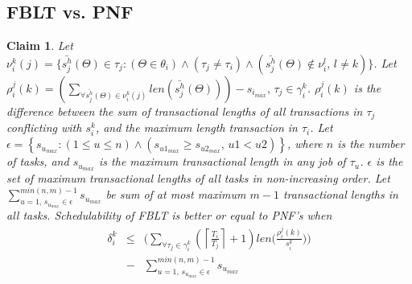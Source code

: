 \documentclass[conference]{IEEEtran}
\newtheorem{clm}{Claim}
\begin{document}
\subsection{FBLT vs. PNF}
%
\begin{clm}\label{clm:fblt_pnf_edf}
%
Let $\nu_{i}^{k}(j)=\Big\{ \bar{s_{j}^{h}}(\Theta)\in\tau_{j}:\left(\Theta\in\theta_{i}\right) \wedge \left(\tau_{j}\ne\tau_{i}\right) \allowbreak \wedge \left(\bar{s_{j}^{h}}(\Theta)\not\in\nu_{i}^{l},\, l\ne k\right)\Big\}$. Let $\rho_{i}^{j}(k)=\left(\sum_{\forall\bar{s_{j}^{h}}(\Theta)\in\nu_{i}^{k}(j)}len\left(\bar{s_{j}^{h}}(\Theta)\right)\right)-s_{i_{max}},\,\tau_{j}\in\gamma_{i}^{k}$. $\rho_{i}^{j}(k)$ is the difference between the sum of transactional lengths of all transactions in $\tau_{j}$ conflicting with $s_{i}^{k}$, and the maximum length transaction in $\tau_{i}$. Let $\epsilon=\left\{ s_{u_{max}}:(1\le u\le n)\wedge\left(s_{u1_{max}}\ge s_{u2_{max}},\, u1<u2\right)\right\} $,
where $n$ is the number of tasks, and $s_{u_{max}}$ is the maximum transactional
length in any job of $\tau_{u}$. $\epsilon$ is the set of maximum transactional lengths of all tasks in non-increasing order. 
%
Let $\sum_{u=1,\, s_{u_{max}}\in\epsilon}^{min(n,m)-1}s_{u_{max}}$ be sum of at most maximum $m-1$ transactional lengths in all tasks. Schedulability of FBLT is better or equal to PNF's when 
\begin{eqnarray*}
\delta_{i}^{k} & \le & \Bigg(\sum_{\forall\tau_{j}\in\gamma_{i}^{k}}\left(\left\lceil \frac{T_{i}}{T_{j}}\right\rceil +1\right) len\Bigg(\frac{\rho_i^j(k)}{s_i^k}\Bigg)\Bigg)\nonumber\\
& - &  \sum_{u=1,\, s_{u_{max}}\in\epsilon}^{min(n,m)-1}s_{u_{max}} \label{eq:fblt_pnf_comparison_1-1-1-1_mod}
\end{eqnarray*}

\end{clm}
\end{document}

